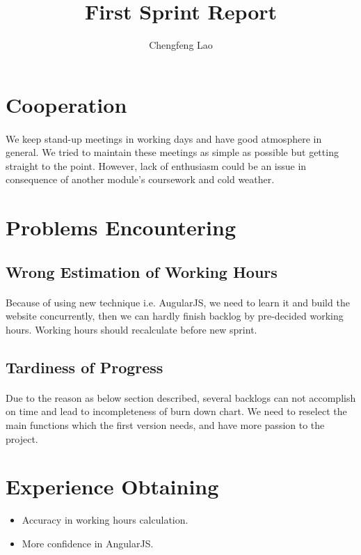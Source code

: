 \documentclass[]{article}
\title{First Sprint Report}
\author{Chengfeng Lao}
\begin{document}
\maketitle

\section{Cooperation}
	
	\paragraph{} We keep stand-up meetings in working days and have good atmosphere in general. We tried to maintain these meetings as simple as possible but getting straight to the point. However, lack of enthusiasm could be an issue in consequence of another module's coursework and cold weather.
	
\section{Problems Encountering}
	
	\subsection{Wrong Estimation of Working Hours}
	\paragraph{} Because of using new technique i.e. AugularJS, we need to learn it and build the website concurrently, then we can hardly finish backlog by pre-decided working hours. Working hours should recalculate before new sprint. 
	
	\subsection{Tardiness of Progress}
	\paragraph{} Due to the reason as below section described, several backlogs can not accomplish on time and lead to incompleteness of burn down chart. We need to reselect the main functions which the first version needs, and have more passion to the project.
	
	\section{Experience Obtaining}

	\begin{itemize}
		\item Accuracy in working hours calculation.
		\item More confidence in AngularJS.
	\end{itemize}
		
\end{document}
